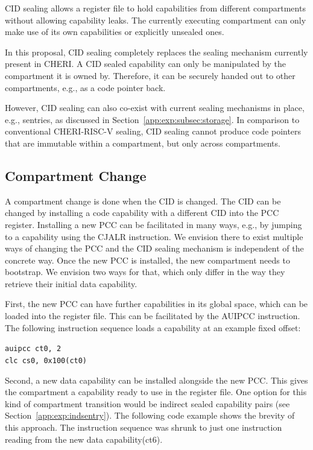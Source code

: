 CID sealing allows a register file to hold capabilities from different compartments without allowing capability leaks.
The currently executing compartment can only make use of its own capabilities or explicitly unsealed ones.

In this proposal, CID sealing completely replaces the sealing mechanism currently present in CHERI.
A CID sealed capability can only be manipulated by the compartment it is owned by.
Therefore, it can be securely handed out to other compartments, e.g., as a code pointer back.

However, CID sealing can also co-exist with current sealing mechanisms in place, e.g., sentries, as discussed in Section~\ref{app:exp:subsec:storage}.
In comparison to conventional CHERI-RISC-V sealing, CID sealing cannot produce code pointers that are immutable within a compartment, but only across compartments.

\subsection{Compartment Change}
\label{app:exp:subsec:comp_change}

A compartment change is done when the CID is changed.
The CID can be changed by installing a code capability with a different CID into the PCC register.
Installing a new PCC can be facilitated in many ways, e.g., by jumping to a capability using the CJALR instruction.
We envision there to exist multiple ways of changing the PCC and the CID sealing mechanism is independent of the concrete way.
Once the new PCC is installed, the new compartment needs to bootstrap.
We envision two ways for that, which only differ in the way they retrieve their initial data capability.

First, the new PCC can have further capabilities in its global space, which can be loaded into the register file.
This can be facilitated by the AUIPCC instruction.
The following instruction sequence loads a capability at an example fixed offset:

\texttt{auipcc ct0, 2}\\
\texttt{clc cs0, 0x100(ct0)}

Second, a new data capability can be installed alongside the new PCC.
This gives the compartment a capability ready to use in the register file.
One option for this kind of compartment transition would be indirect sealed capability pairs (see Section~\ref{app:exp:indsentry}).
The following code example shows the brevity of this approach.
The instruction sequence was shrunk to just one instruction reading from the new data capability(ct6).

